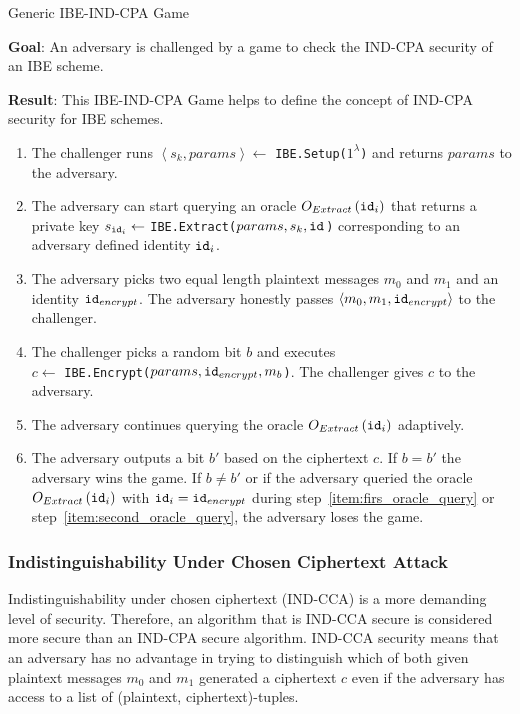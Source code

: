 \begin{game}
\caption{Generic IBE-IND-CPA Game~\cite{thesis:Alfredo08}}
\label{game:ind_cpa_game}
\begin{description}
 \item \textbf{Goal}: An adversary is challenged by a game to check the IND-CPA security of an IBE scheme.
 
 \item \textbf{Result}: This IBE-IND-CPA Game helps to define the concept of IND-CPA security for IBE schemes.
\end{description}

 \begin{enumerate}
  \item The challenger runs $\left< s_k, params\right> \leftarrow$ \texttt{IBE.Setup($1^{\lambda}$)} and returns $params$ to the adversary.
  \item \label{item:firs_oracle_query} The adversary can start querying an oracle $O_{Extract} \left( \mathtt{id}_{i} \right)$ that returns a private key $s_{\mathtt{id}_{i}} \leftarrow$ \texttt{IBE.Extract($params, s_k, \mathtt{id}_{}$)} corresponding to an adversary defined identity $\mathtt{id}_{i}$.
  \item The adversary picks two equal length plaintext messages $m_0$ and $m_1$ and an identity $\mathtt{id}_{encrypt}$. The adversary honestly passes $\left< m_0, m_1, \mathtt{id}_{encrypt} \right>$ to the challenger.
  \item The challenger picks a random bit $b$ and executes \\ $c \leftarrow$ \texttt{IBE.Encrypt($params, \mathtt{id}_{encrypt}, m_b$)}. The challenger gives $c$ to the adversary.
  \item \label{item:second_oracle_query} The adversary continues querying the oracle $O_{Extract} \left( \mathtt{id}_{i} \right)$ adaptively.
  \item The adversary outputs a bit $b'$ based on the ciphertext $c$. If $b = b'$ the adversary wins the game. If $b \neq b'$ or if the adversary queried the oracle $O_{Extract} \left( \mathtt{id}_{i} \right)$ with $\mathtt{id}_{i} = \mathtt{id}_{encrypt}$ during step~\ref{item:firs_oracle_query} or step~\ref{item:second_oracle_query}, the adversary loses the game.
 \end{enumerate}
\end{game}

\subsubsection{Indistinguishability Under Chosen Ciphertext Attack}
Indistinguishability under chosen ciphertext (IND-CCA) is a more demanding level of security. Therefore, an algorithm that is IND-CCA secure is considered more secure than an IND-CPA secure algorithm. IND-CCA security means that an adversary has no advantage in trying to distinguish which of both given plaintext messages $m_0$ and $m_1$ generated a ciphertext $c$ even if the adversary has access to a list of (plaintext, ciphertext)-tuples.

